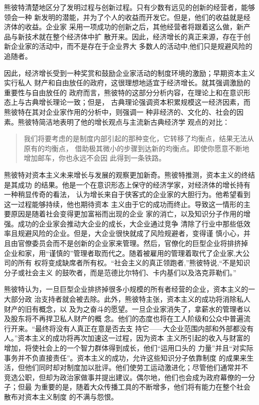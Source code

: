 熊彼特清楚地区分了发明过程与创新过程。只有少数有远见的创新的经营者，能够领会一种
新发明的潜能，并为了个人的收益而开发它。但是，他们的收益就是经济体的收益。企业家
采用一项成功的创新之后，其他经营者将跟着这么做，新产品与新技术就在整个经济体中扩
散开来。因此，经济增长的真正来源，存在于创新企业家的活动中，而不是存在于企业界大
多数人的活动中,他们只是规避风险的追随者。

因此，经济增长受到一种奖赏和鼓励企业家活动的制度环境的激励；早期资本主义实行私人
财产和自由放任的政府，这很理想地适宜于经济增长。就其强调激励的重要性与自由放任的
政府而言，熊彼特的这部分分析内容，在理论上和在意识形态上与古典增长理论一致；但是，
古典理论强调资本积累规模这一经济因素，而熊彼特在其对企业家作用的分析中，则强调一
种非经济的、文化的、社会的因素。熊彼特简洁地表明了他的增长观点与主流新古典经济学
观点的对比：

\begin{quotation}
  我们将要考虑的是制度内部引起的那种变化，它转移了均衡点，结果无法从原有的均衡点，
  借助极其微小的步骤到达新的均衡点。即使你愿意不断地增加邮车，你也永远不会因
  此得到一条铁路。
\end{quotation}

熊彼特对资本主义未来增长与发展的观察更加新奇。熊彼特推测，资本主义的终结是其成功
的结果。他是一个在意识形态上保守的经济学家，对经济体的增长持有一种稍显传奇的看法，
认为增长来自于侠客式的企业家的大胆行为。他希望看到这一过程能够持续，他也期待资本
主义由于它的成功而终止。导致这一情形的主要原因是随着社会变得更加富裕而出现的企业
家的消亡，以及知识分子作用的增强。成功的企业家会推动大企业的成长，大企业通过竞争
清除了行业中那些低效率且规避风险的企业。但是，大企业很快就成了风险规避者，变得谨
慎小心，并且由官僚委员会而不是创新的企业家来管理。然后，官僚化的巨型企业将排挤掉
企业和家，用“谨慎的”管理者取而代之。随着被雇用的管理着取代了企业家,大公司的所有
权将变成缺席者所有权。“社会主义的真正领跑者,”熊彼特说,“不是知识分子或社会主义
的鼓吹者，而是范德比尔特们、卡内基们以及洛克菲勒们。”

熊彼特认为，一旦巨型企业排挤掉很多小规模的所有者经营的企业，资本主义的一大部分政
治支持者就会被去除。此外，熊彼特主张，资本主义的成功将消除私人财产的旧有概念，以
及为之奋斗的愿望。一旦企业家消失了，拿薪水的管理者以及股东将不再捍卫私人财产的概
念。他们的态度也将在工人阶级和公众中普遍流行开来。“最终将没有人真正在意是否去支
持它——大企业范围内部和外部都没有人。”资本主义的成功将再次加速这一过程，因为资本
主义所引起的收入与财富的增加，将使社会上的一个智力群体得到成长，他们“运用口头的
力量”并且“对实际事务并不负直接责任”。资本主义的成功，允许这些知识分子依靠制度
的成果来生活，但他们同时却对制度加以批评。他们使劳工运动激进化；尽管他们通常并不
竞选公职，但却为政治家做事并提出建议。偶尔地，他们也会成为政府幕僚的一分子；但最
为重要的是，随着大众传播工具的不断增多，他们将有能力在整个社会散布对资本主义制度
的不满与怨恨。

